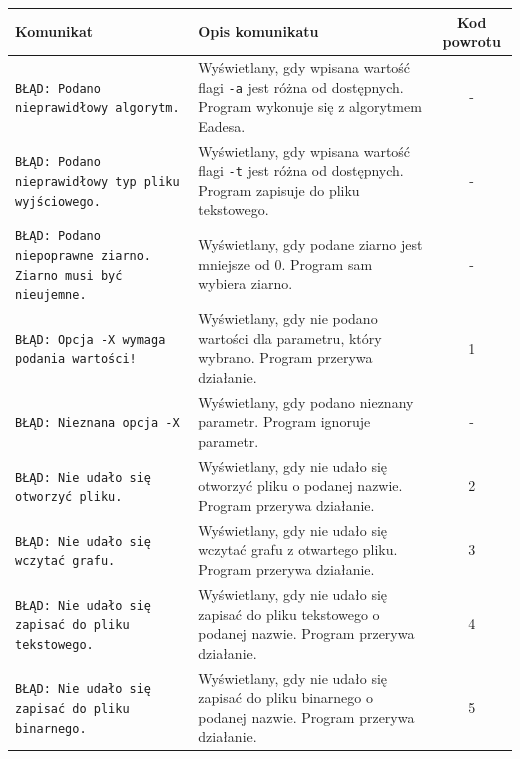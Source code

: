 \documentclass[]{article}
\begin{document}
	\begin{tabularx}{\textwidth}{| X | X | c |}
		\hline
		Komunikat & Opis komunikatu & Kod powrotu\\
		\hline
		\texttt{BŁĄD: Podano nieprawidłowy algorytm.} & Wyświetlany, gdy wpisana wartość flagi 
		\texttt{-a} jest różna od dostępnych. Program wykonuje się z algorytmem Eadesa. & -\\
		\hline
		\texttt{BŁĄD: Podano nieprawidłowy typ pliku wyjściowego.} & Wyświetlany, gdy wpisana wartość 
		flagi \texttt{-t} jest różna od dostępnych. Program zapisuje do pliku tekstowego. & -\\
		\hline
		\texttt{BŁĄD: Podano niepoprawne ziarno. Ziarno musi być nieujemne.} & Wyświetlany, gdy podane ziarno jest mniejsze od 
		0. Program sam wybiera ziarno. & -\\
		\hline
		\texttt{BŁĄD: Opcja -X wymaga podania wartości!} & Wyświetlany, gdy nie podano wartości dla parametru, który wybrano. 
		Program przerywa działanie. & 1\\
		\hline
		\texttt{BŁĄD: Nieznana opcja -X} & Wyświetlany, gdy podano nieznany parametr. Program ignoruje parametr. & -\\
		\hline
		\texttt{BŁĄD: Nie udało się otworzyć pliku.} & Wyświetlany, gdy nie udało się otworzyć pliku o podanej nazwie.
		Program przerywa działanie. & 2\\
		\hline
		\texttt{BŁĄD: Nie udało się wczytać grafu.} & Wyświetlany, gdy nie udało się wczytać grafu z otwartego pliku.
		Program przerywa działanie. & 3\\
		\hline
		\texttt{BŁĄD: Nie udało się zapisać do pliku tekstowego.} & Wyświetlany, gdy nie udało się zapisać do pliku tekstowego o 
		podanej nazwie. Program przerywa działanie. & 4\\
		\hline
		\texttt{BŁĄD: Nie udało się zapisać do pliku binarnego.} & Wyświetlany, gdy nie udało się zapisać do pliku binarnego o
		podanej nazwie. Program przerywa działanie. & 5\\
		\hline
	\end{tabularx}
	
\end{document}
